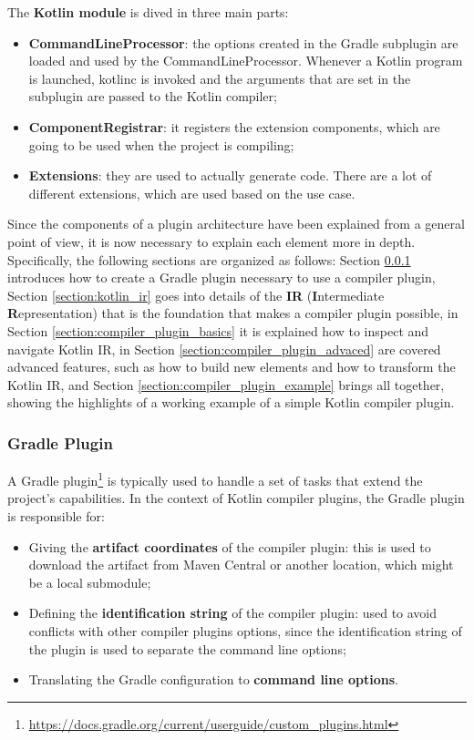 \noindent The \textbf{Kotlin module} is dived in three main parts:
\begin{itemize}
    \item \textbf{CommandLineProcessor}: the options created in the Gradle subplugin are loaded and used by the CommandLineProcessor. Whenever a Kotlin program is launched, kotlinc is invoked and the arguments that are set in the subplugin are passed to the Kotlin compiler;
    \item \textbf{ComponentRegistrar}: it registers the extension components, which are going to be used when the project is compiling;
    \item \textbf{Extensions}: they are used to actually generate code. There are a lot of different extensions, which are used based on the use case.
\end{itemize}

Since the components of a plugin architecture have been explained from a general point of view, it is now necessary to explain each element more in depth.\newline
Specifically, the following sections are organized as follows: Section \ref{section:gradle_plugin} introduces how to create a Gradle plugin necessary to use a compiler plugin, Section \ref{section:kotlin_ir} goes into details of the \textbf{IR} (\textbf{I}ntermediate \textbf{R}epresentation) that is the foundation that makes a compiler plugin possible, in Section \ref{section:compiler_plugin_basics} it is explained how to inspect and navigate Kotlin IR, in Section \ref{section:compiler_plugin_advaced} are covered advanced features, such as how to build new elements and how to transform the Kotlin IR, and Section \ref{section:compiler_plugin_example} brings all together, showing the highlights of a working example of a simple Kotlin compiler plugin.

\subsubsection{Gradle Plugin}\label{section:gradle_plugin}
A Gradle plugin\footnote{\url{https://docs.gradle.org/current/userguide/custom_plugins.html}} is typically used to handle a set of tasks that extend the project's capabilities.\newline
In the context of Kotlin compiler plugins, the Gradle plugin is responsible for:
\begin{itemize}
    \item Giving the \textbf{artifact coordinates} of the compiler plugin: this is used to download the artifact from Maven Central or another location, which might be a local submodule;
    \item Defining the \textbf{identification string} of the compiler plugin: used to avoid conflicts with other compiler plugins options, since the identification string of the plugin is used to separate the command line options;
    \item Translating the Gradle configuration to \textbf{command line options}.
\end{itemize}

